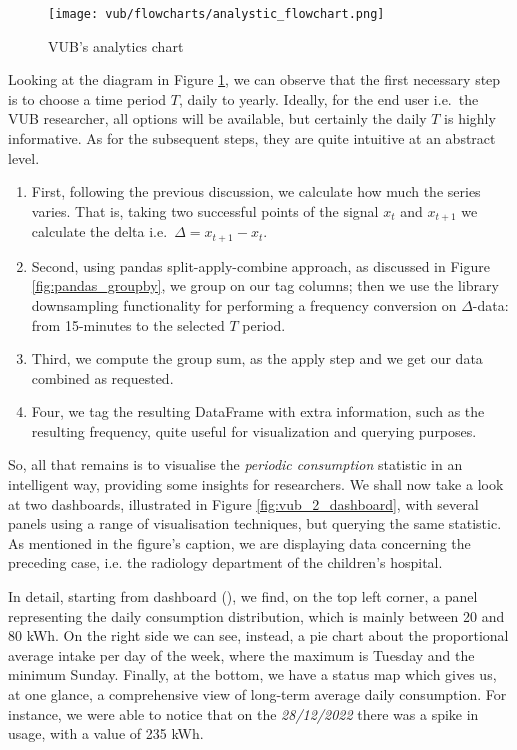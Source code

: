 \begin{figure}[ht]
    \texttt{[image: vub/flowcharts/analystic\_flowchart.png]}
    \caption{\acs{VUB}'s analytics chart}
    \label{fig:vub_anal_chart}
\end{figure}
Looking at the diagram in Figure \ref{fig:vub_anal_chart}, we can observe that the first necessary step is to choose a time period $T$, daily to yearly.
Ideally, for the end user i.e.\ the VUB researcher, all options will be available, but certainly the daily $T$ is highly informative.
As for the subsequent steps, they are quite intuitive at an abstract level.
\begin{enumerate}
    \item First, following the previous discussion, we calculate how much the series varies. 
    That is, taking two successful points of the signal $x_t$ and $x_{t+1}$ we calculate the delta i.e.\ $\Delta = x_{t+1} - x_t$.
    \item Second, using pandas split-apply-combine approach, as discussed in Figure \ref{fig:pandas_groupby}, we group on our tag columns; then we use the library downsampling 
    functionality for performing a frequency conversion on $\Delta$-data: from 15-minutes to the selected $T$ period.
    \item Third, we compute the group sum, as the apply step and we get our data combined as requested.
    \item Four, we tag the resulting DataFrame with extra information, such as the resulting frequency, quite useful for visualization and querying purposes.
\end{enumerate}

So, all that remains is to visualise the \textit{periodic consumption} statistic in an intelligent way, providing some insights for researchers.
We shall now take a look at two dashboards, illustrated in Figure \ref{fig:vub_2_dashboard}, with several panels using a range of visualisation techniques, but querying the same statistic.
As mentioned in the figure's caption, we are displaying data concerning the preceding case, i.e. the radiology department of the children's hospital.

In detail, starting from dashboard (), we find, on the top left corner, a panel representing the daily consumption distribution, which is mainly between 20 and 80 kWh. 
On the right side we can see, instead, a pie chart about the proportional average intake per day of the week, where the maximum is Tuesday and the minimum Sunday. 
Finally, at the bottom, we have a status map which gives us, at one glance, a comprehensive view of long-term average daily consumption. 
For instance, we were able to notice that on the \textit{28/12/2022} there was a spike in usage, with a value of 235 kWh.

